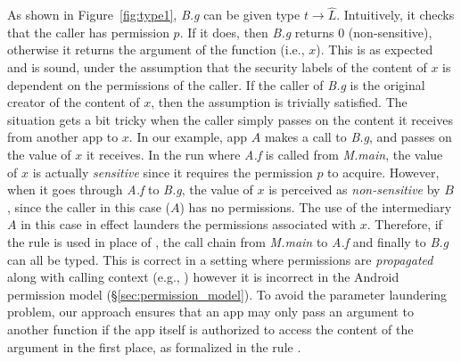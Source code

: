 {{{As shown in Figure~\ref{fig:type1}, \textit{B.g} can be given type $t \rightarrow \hat{L}$. Intuitively, it checks that the
caller has permission $p$. If it does, then \textit{B.g} returns 0 (non-sensitive), otherwise it returns the
argument of the function (i.e., $x$). This is as expected and is sound, under the assumption that the security labels of
the content of $x$ is dependent on the permissions of the caller. If the caller of \textit{B.g} is the original creator of the content of $x$,
then the assumption is trivially satisfied. The situation gets a bit tricky when the caller simply passes on the content  it
receives from another app to $x$. In our example, app $A$ makes a call to \textit{B.g}, and passes on the value of $x$ it receives.
In the run where \textit{A.f} is called from \textit{M.main}, the value of $x$ is actually \emph{sensitive} since it requires the permission $p$ to acquire.
However, when it goes through \textit{A.f} to \textit{B.g}, the value of $x$ is perceived as \emph{non-sensitive} by $B$, since
the caller in this case ($A$) has no permissions. The use of the intermediary $A$ in this case in effect launders the permissions
associated with $x.$
Therefore, if the rule  is used in place of , the call chain
from \textit{M.main} to \textit{A.f} and finally to \textit{B.g} can
all be typed.
This is correct in a setting where permissions are \emph{propagated}
along with calling context (e.g., \cite{Banerjee:2005ht}) however it
is incorrect in the Android permission model (\S\ref{sec:permission_model}). 
To avoid the parameter laundering problem, our approach ensures that an app may only pass an argument
to another function if the app itself is authorized to access the content of the argument in the first place,
as formalized in the rule .

}}}
